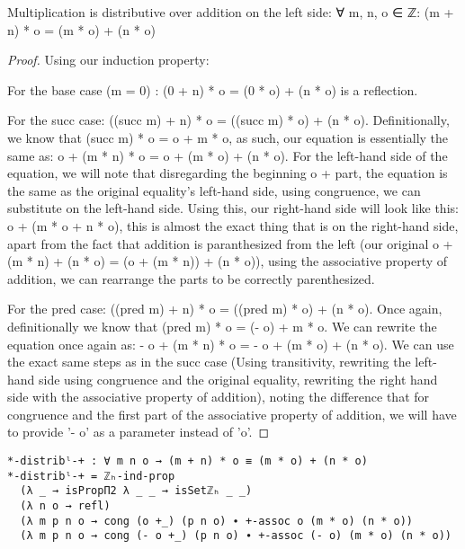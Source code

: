 \begin{theorem}
  Multiplication is distributive over addition on the left side: ∀ m, n, o ∈ ℤ: (m + n) * o = (m * o) + (n * o)
\end{theorem}

\begin{proof}
  Using our induction property:

  For the base case (m = 0) : (0 + n) * o = (0 * o) + (n * o) is a reflection.

  For the succ case: ((succ m) + n) * o = ((succ m) * o) + (n * o). Definitionally, we know that (succ m) * o = o + m * o, as such, our equation is essentially the same as: o + (m * n) * o = o + (m * o) + (n * o). For the left-hand side of the equation, we will note that disregarding the beginning o + part, the equation is the same as the original equality's left-hand side, using congruence, we can substitute on the left-hand side. Using this, our right-hand side will look like this: o + (m * o + n * o), this is almost the exact thing that is on the right-hand side, apart from the fact that addition is paranthesized from the left (our original o + (m * n) + (n * o) = (o + (m * n)) + (n * o)), using the associative property of addition, we can rearrange the parts to be correctly parenthesized.

  For the pred case: ((pred m) + n) * o = ((pred m) * o) + (n * o). Once again, definitionally we know that (pred m) * o = (- o) + m * o. We can rewrite the equation once again as: - o + (m * n) * o = - o + (m * o) + (n * o). We can use the exact same steps as in the succ case (Using transitivity, rewriting the left-hand side using congruence and the original equality, rewriting the right hand side with the associative property of addition), noting the difference that for congruence and the first part of the associative property of addition, we will have to provide '- o' as a parameter instead of 'o'.
\end{proof}

\begin{listing}[H]
\begin{verbatim}
*-distribˡ-+ : ∀ m n o → (m + n) * o ≡ (m * o) + (n * o)
*-distribˡ-+ = ℤₕ-ind-prop
  (λ _ → isPropΠ2 λ _ _ → isSetℤₕ _ _)
  (λ n o → refl)
  (λ m p n o → cong (o +_) (p n o) ∙ +-assoc o (m * o) (n * o))
  (λ m p n o → cong (- o +_) (p n o) ∙ +-assoc (- o) (m * o) (n * o))
\end{verbatim}
\caption{Agda proof of multiplication being left distributive to addition}
\end{listing}

